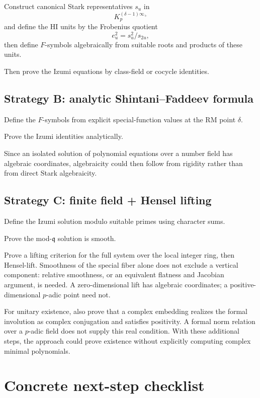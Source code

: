 \documentclass[11pt,reqno]{amsart}
\theoremstyle{plain}
\begin{document}
Construct canonical Stark representatives \(s_u\) in
\[
K_p^{(\delta-1)\infty_+}
\]
and define the HI units by the Frobenius quotient
\[
e_u^2=s_u^2/s_{2u},
\]
then define \(F\)-symbols algebraically from suitable roots and products of these units.

Then prove the Izumi equations by class-field or cocycle identities.

\subsection{Strategy B: analytic Shintani--Faddeev formula}\label{sec:17.2}

Define the \(F\)-symbols from explicit special-function values at the RM point \(\delta\).

Prove the Izumi identities analytically.

Since an isolated solution of polynomial equations over a number field has algebraic coordinates, algebraicity could then follow from rigidity rather than from direct Stark algebraicity.

\subsection{Strategy C: finite field + Hensel lifting}\label{sec:17.3}

Define the Izumi solution modulo suitable primes using character sums.

Prove the mod-\(\mathfrak q\) solution is smooth.

Prove a lifting criterion for the full system over the local integer
ring, then Hensel-lift. Smoothness of the special fiber alone does not
exclude a vertical component: relative smoothness, or an equivalent
flatness and Jacobian argument, is needed. A zero-dimensional lift has
algebraic coordinates; a positive-dimensional \(p\)-adic point need not.

For unitary existence, also prove that a complex embedding realizes the
formal involution as complex conjugation and satisfies positivity. A
formal norm relation over a \(p\)-adic field does not supply this real
condition. With these additional steps, the approach could prove
existence without explicitly computing complex minimal polynomials.

\section{Concrete next-step checklist}\label{sec:18}
\end{document}
